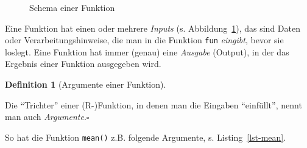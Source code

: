 \documentclass[
  letterpaper,
]{scrbook}
\newenvironment{Shaded}{\begin{snugshade}}{\end{snugshade}}
\newcommand{\AttributeTok}[1]{\textcolor[rgb]{0.40,0.45,0.13}{#1}}
\newcommand{\ConstantTok}[1]{\textcolor[rgb]{0.56,0.35,0.01}{#1}}
\newcommand{\DecValTok}[1]{\textcolor[rgb]{0.68,0.00,0.00}{#1}}
\newcommand{\FunctionTok}[1]{\textcolor[rgb]{0.28,0.35,0.67}{#1}}
\newcommand{\NormalTok}[1]{\textcolor[rgb]{0.00,0.23,0.31}{#1}}
\theoremstyle{definition}
\theoremstyle{definition}
\newtheorem{definition}{Definition}[chapter]
\theoremstyle{definition}
\theoremstyle{remark}
\begin{document}
\begin{figure}


\caption{\label{fig-function-schema}Schema einer Funktion}

\end{figure}%

Eine Funktion hat einen oder mehrere \emph{Inputs} (s.
Abbildung~\ref{fig-function-schema}), das sind Daten oder
Verarbeitungshinweise, die man in die Funktion \texttt{fun}
\emph{eingibt}, bevor sie loslegt. Eine Funktion hat immer (genau) eine
\emph{Ausgabe} (Output), in der das Ergebnis einer Funktion ausgegeben
wird.

\begin{definition}[Argumente einer
Funktion]\protect\hypertarget{def-args}{}\label{def-args}

Die ``Trichter'' einer (R-)Funktion, in denen man die Eingaben
``einfüllt'', nennt man auch \emph{Argumente}.\(\square\)

\end{definition}

So hat die Funktion \texttt{mean()} z.B. folgende Argumente, s.
Listing~\ref{lst-mean}.

\begin{codelisting}

\caption{\label{lst-mean}Die Argumente der R-Funktion \texttt{mean}}

\centering{

\begin{Shaded}
\begin{Highlighting}[]
\FunctionTok{mean}\NormalTok{(x, }\AttributeTok{trim =} \DecValTok{0}\NormalTok{, }\AttributeTok{na.rm =} \ConstantTok{FALSE}\NormalTok{, ...)}
\end{Highlighting}
\end{Shaded}

}

\end{codelisting}%
\end{document}
